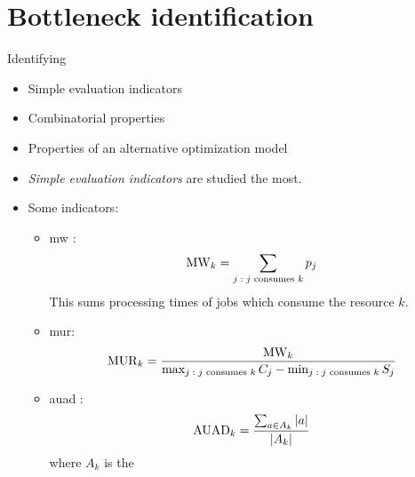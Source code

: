 \section*{Bottleneck identification}

Identifying 

\begin{itemize}
    \item Simple evaluation indicators
    \item Combinatorial properties
    \item Properties of an alternative optimization model
\end{itemize}

\begin{itemize}
    \item \emph{Simple evaluation indicators} are studied the most.

    \item Some indicators:
    \begin{itemize}
        \item \ac{mw} \citep{}:
            $$
            \operatorname{MW}_{k} = \sum_{j \;:\; \text{$j$ consumes $k$}} p_j
            $$ 
            This sums processing times of jobs which consume the resource $k$.

        \item \ac{mur}:
            $$
            \operatorname{MUR}_{k} = \frac{\operatorname{MW}_{k}}{\max_{j \;:\; \text{$j$ consumes $k$}} C_j - \min_{j \;:\; \text{$j$ consumes $k$}} S_j}
            $$

        \item \ac{auad} \citep{ROSER2001}:
            $$
            \operatorname{AUAD}_{k} = \frac{\sum_{a \in A_k} \left|{a}\right|}{\left|{A_k}\right|}
            $$
            where $A_k$ is the 
    \end{itemize}
\end{itemize}
